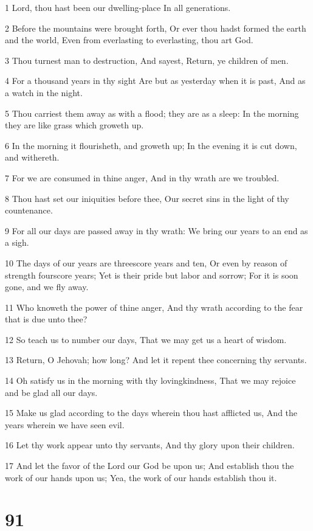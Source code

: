 \par 1 Lord, thou hast been our dwelling-place In all generations.
\par 2 Before the mountains were brought forth, Or ever thou hadst formed the earth and the world, Even from everlasting to everlasting, thou art God.
\par 3 Thou turnest man to destruction, And sayest, Return, ye children of men.
\par 4 For a thousand years in thy sight Are but as yesterday when it is past, And as a watch in the night.
\par 5 Thou carriest them away as with a flood; they are as a sleep: In the morning they are like grass which groweth up.
\par 6 In the morning it flourisheth, and groweth up; In the evening it is cut down, and withereth.
\par 7 For we are consumed in thine anger, And in thy wrath are we troubled.
\par 8 Thou hast set our iniquities before thee, Our secret sins in the light of thy countenance.
\par 9 For all our days are passed away in thy wrath: We bring our years to an end as a sigh.
\par 10 The days of our years are threescore years and ten, Or even by reason of strength fourscore years; Yet is their pride but labor and sorrow; For it is soon gone, and we fly away.
\par 11 Who knoweth the power of thine anger, And thy wrath according to the fear that is due unto thee?
\par 12 So teach us to number our days, That we may get us a heart of wisdom.
\par 13 Return, O Jehovah; how long? And let it repent thee concerning thy servants.
\par 14 Oh satisfy us in the morning with thy lovingkindness, That we may rejoice and be glad all our days.
\par 15 Make us glad according to the days wherein thou hast afflicted us, And the years wherein we have seen evil.
\par 16 Let thy work appear unto thy servants, And thy glory upon their children.
\par 17 And let the favor of the Lord our God be upon us; And establish thou the work of our hands upon us; Yea, the work of our hands establish thou it.

\chapter{91}

